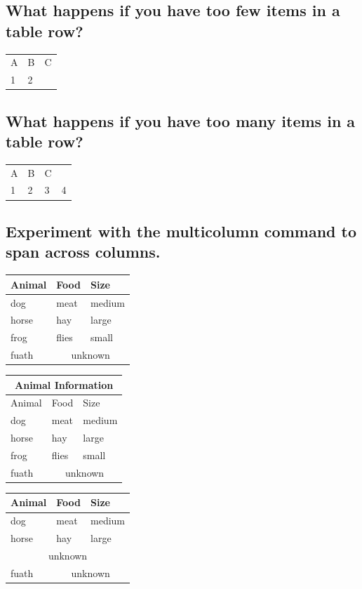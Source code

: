 \documentclass{article}
\begin{document}
\subsection*{What happens if you have too few items in a table row?}

 \begin{tabular}{lll}
A & B & C \\
1 & 2\\
 \end{tabular}

\subsection*{What happens if you have too many items in a table row?}

 \begin{tabular}{llll}
A & B & C \\
1 & 2 & 3 & 4
 \end{tabular}

\subsection*{Experiment with the multicolumn command to span across columns.}


 \begin{tabular}{lll}
 \toprule
 Animal & Food & Size \\
 \midrule
 dog & meat & medium \\
 horse & hay & large \\
 frog & flies & small \\
 fuath & \multicolumn{2}{c}{unknown} \\
 \bottomrule
 \end{tabular}

\vspace{2em}

 \begin{tabular}{lll}
 \toprule
 \multicolumn{3}{c}{Animal Information}\\
\hline
 Animal & Food & Size \\
 \midrule
 dog & meat & medium \\
 horse & hay & large \\
 frog & flies & small \\
 fuath & \multicolumn{2}{c}{unknown} \\
 \bottomrule
 \end{tabular}

\vspace{2em}

 \begin{tabular}{lll}
 \toprule
 Animal & Food & Size \\
 \midrule
 dog & meat & medium \\
 horse & hay & large \\
\multicolumn{3}{c}{unknown} \\
 fuath & \multicolumn{2}{c}{unknown} \\
 \bottomrule
 \end{tabular}

 
\end{document}
